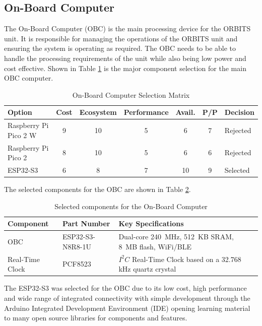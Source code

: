 \documentclass[a4paper,12pt,titlepage]{report}
\begin{document}
\subsection{On-Board Computer}

The On-Board Computer (OBC) is the main processing device for the ORBITS unit. It is responsible for managing the operations of the ORBITS unit and ensuring the system is operating as required. The OBC needs to be able to handle the processing requirements of the unit while also being low power and cost effective. Shown in Table \ref{tab:obc_selection_matrix} is the major component selection for the main OBC computer.

\begin{table}[h]
\centering
\caption{On-Board Computer Selection Matrix}
\label{tab:obc_selection_matrix}
\begin{tabular}{|p{3cm}|c|c|c|c|c|p{2.5cm}|}
\hline
\textbf{Option} & \textbf{Cost} & \textbf{Ecosystem} & \textbf{Performance} & \textbf{Avail.} & \textbf{P/P} & \textbf{Decision} \\ \hline
Raspberry Pi Pico 2 W & 9 & 10 & 5 & 6 & 7 & Rejected \\ \hline
Raspberry Pi Pico 2 & 8 & 10 & 5 & 6 & 6 & Rejected \\ \hline
ESP32-S3 & 6 & 8 & 7 & 10 & 9 & Selected \\ \hline
\end{tabular}
\end{table}

The selected components for the OBC are shown in Table \ref{tab:obc_selected_components}.
\begin{table}[h]
    \centering
    \caption{Selected components for the On-Board Computer}
    \label{tab:obc_selected_components}
    \begin{tabular}{|p{4cm}|p{4cm}|p{6cm}|}
    \hline
    \textbf{Component} & \textbf{Part Number} & \textbf{Key Specifications} \\ \hline
    OBC & ESP32-S3-N8R8-1U & Dual-core 240~MHz, 512~KB SRAM, 8~MB flash, WiFi/BLE \\\hline
    Real-Time Clock & PCF8523 & \(I^2C\) Real-Time Clock based on a 32.768 kHz quartz crystal\\\hline
    \end{tabular}
\end{table}

The ESP32-S3 was selected for the OBC due to its low cost, high performance and wide range of integrated connectivity with simple development through the Arduino Integrated Development Environment (IDE) opening learning material to many open source libraries for components and features. 
\end{document}
